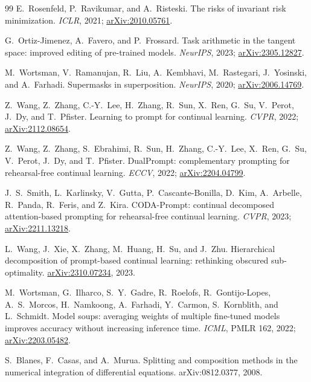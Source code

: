 \documentclass[11pt]{article}
\begin{document}
\begin{thebibliography}{99}
 E.~Rosenfeld, P.~Ravikumar, and
A.~Risteski.
The risks of invariant risk minimization.
\emph{ICLR}, 2021;
\href{https://arxiv.org/abs/2010.05761}{arXiv:2010.05761}.

 G.~Ortiz-Jimenez, A.~Favero, and
P.~Frossard.
Task arithmetic in the tangent space: improved editing of pre-trained
models.
\emph{NeurIPS}, 2023;
\href{https://arxiv.org/abs/2305.12827}{arXiv:2305.12827}.

 M.~Wortsman, V.~Ramanujan, R.~Liu,
A.~Kembhavi, M.~Rastegari, J.~Yosinski, and A.~Farhadi.
Supermasks in superposition.
\emph{NeurIPS}, 2020;
\href{https://arxiv.org/abs/2006.14769}{arXiv:2006.14769}.

 Z.~Wang, Z.~Zhang, C.-Y.~Lee, H.~Zhang, R.~Sun,
X.~Ren, G.~Su, V.~Perot, J.~Dy, and T.~Pfister.
Learning to prompt for continual learning.
\emph{CVPR}, 2022;
\href{https://arxiv.org/abs/2112.08654}{arXiv:2112.08654}.

 Z.~Wang, Z.~Zhang, S.~Ebrahimi, R.~Sun,
H.~Zhang, C.-Y.~Lee, X.~Ren, G.~Su, V.~Perot, J.~Dy, and T.~Pfister.
DualPrompt: complementary prompting for rehearsal-free continual learning.
\emph{ECCV}, 2022;
\href{https://arxiv.org/abs/2204.04799}{arXiv:2204.04799}.

 J.~S.~Smith, L.~Karlinsky, V.~Gutta, P.~Cascante-Bonilla,
D.~Kim, A.~Arbelle, R.~Panda, R.~Feris, and Z.~Kira.
CODA-Prompt: continual decomposed attention-based prompting for
rehearsal-free continual learning.
\emph{CVPR}, 2023;
\href{https://arxiv.org/abs/2211.13218}{arXiv:2211.13218}.

 L.~Wang, J.~Xie, X.~Zhang, M.~Huang,
H.~Su, and J.~Zhu.
Hierarchical decomposition of prompt-based continual learning: rethinking
obscured sub-optimality.
\href{https://arxiv.org/abs/2310.07234}{arXiv:2310.07234}, 2023.

 M.~Wortsman, G.~Ilharco, S.~Y.~Gadre,
R.~Roelofs, R.~Gontijo-Lopes, A.~S.~Morcos, H.~Namkoong, A.~Farhadi,
Y.~Carmon, S.~Kornblith, and L.~Schmidt.
Model soups: averaging weights of multiple fine-tuned models improves
accuracy without increasing inference time.
\emph{ICML}, PMLR 162, 2022;
\href{https://arxiv.org/abs/2203.05482}{arXiv:2203.05482}.

 S.~Blanes, F.~Casas, and A.~Murua.
Splitting and composition methods in the numerical integration of
differential equations.
arXiv:0812.0377, 2008.


\end{thebibliography}
\end{document}
